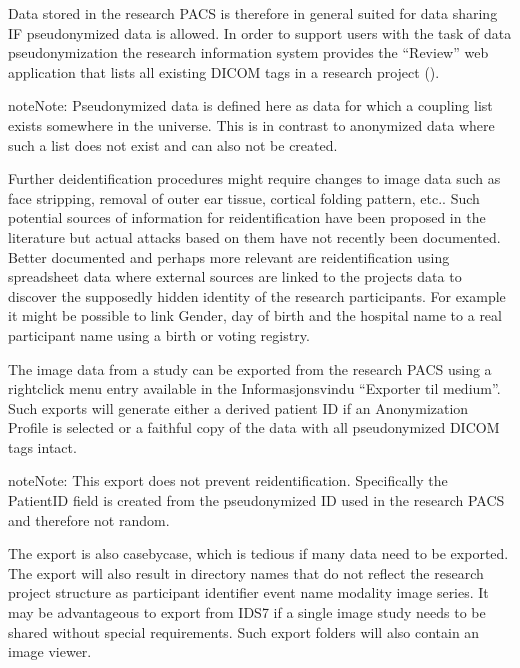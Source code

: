 \documentclass[letterpaper,10pt,english]{sphinxmanual}
\begin{document}
\sphinxAtStartPar
Data stored in the research PACS is therefore in general suited for data sharing IF pseudonymized data is allowed. In order to support users with the task of data pseudonymization the research information system provides the “Review” web application that lists all existing DICOM tags in a research project ().

\begin{sphinxadmonition}{note}{Note:}
\sphinxAtStartPar
Pseudonymized data is defined here as data for which a coupling list exists somewhere in the universe. This is in contrast to anonymized data where such a list does not exist and can also not be created.
\end{sphinxadmonition}

\sphinxAtStartPar
Further de\sphinxhyphen{}identification procedures might require changes to image data such as face stripping, removal of outer ear tissue, cortical folding pattern, etc.. Such potential sources of information for re\sphinxhyphen{}identification have been proposed in the literature but actual attacks based on them have not recently been documented. Better documented and perhaps more relevant are re\sphinxhyphen{}identification using spreadsheet data where external sources are linked to the projects data to discover the supposedly hidden identity of the research participants. For example it might be possible to link Gender, day of birth and the hospital name to a real participant name using a birth or voting registry.

\sphinxAtStartPar
{}

\sphinxAtStartPar
The image data from a study can be exported from the research PACS using a right\sphinxhyphen{}click menu entry available in the Informasjonsvindu “Exporter til medium”. Such exports will generate either a derived patient ID \textendash{} if an Anonymization Profile is selected or a faithful copy of the data with all pseudonymized DICOM tags intact.

\begin{sphinxadmonition}{note}{Note:}
\sphinxAtStartPar
This export does not prevent re\sphinxhyphen{}identification. Specifically the PatientID field is created from the pseudonymized ID used in the research PACS and therefore not random.
\end{sphinxadmonition}

\sphinxAtStartPar
The export is also case\sphinxhyphen{}by\sphinxhyphen{}case, which is tedious if many data need to be exported. The export will also result in directory names that do not reflect the research project structure as participant identifier \textendash{} event name \textendash{} modality \textendash{} image series. It may be advantageous to export from IDS7 if a single image study needs to be shared without special requirements. Such export folders will also contain an image viewer.
\end{document}
